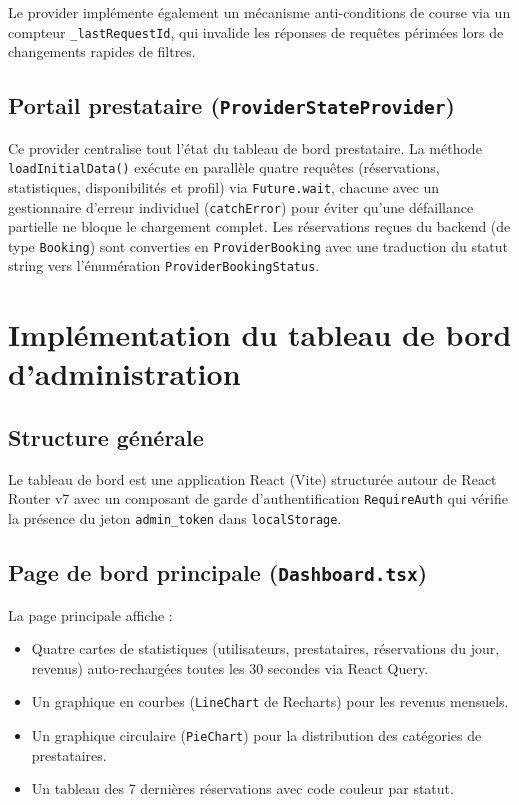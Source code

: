 Le provider implémente également un mécanisme anti-conditions de course via un compteur \texttt{\_lastRequestId}, qui invalide les réponses de requêtes périmées lors de changements rapides de filtres.

\subsection{Portail prestataire (\texttt{ProviderStateProvider})}

Ce provider centralise tout l'état du tableau de bord prestataire. La méthode \texttt{loadInitialData()} exécute en parallèle quatre requêtes (réservations, statistiques, disponibilités et profil) via \texttt{Future.wait}, chacune avec un gestionnaire d'erreur individuel (\texttt{catchError}) pour éviter qu'une défaillance partielle ne bloque le chargement complet. Les réservations reçues du backend (de type \texttt{Booking}) sont converties en \texttt{ProviderBooking} avec une traduction du statut string vers l'énumération \texttt{ProviderBookingStatus}.

\section{Implémentation du tableau de bord d'administration}

\subsection{Structure générale}

Le tableau de bord est une application React (Vite) structurée autour de React Router v7 avec un composant de garde d'authentification \texttt{RequireAuth} qui vérifie la présence du jeton \texttt{admin\_token} dans \texttt{localStorage}.

\subsection{Page de bord principale (\texttt{Dashboard.tsx})}

La page principale affiche :
\begin{itemize}
    \item Quatre cartes de statistiques (utilisateurs, prestataires, réservations du jour, revenus) auto-rechargées toutes les 30 secondes via React Query.
    \item Un graphique en courbes (\texttt{LineChart} de Recharts) pour les revenus mensuels.
    \item Un graphique circulaire (\texttt{PieChart}) pour la distribution des catégories de prestataires.
    \item Un tableau des 7 dernières réservations avec code couleur par statut.
\end{itemize}

